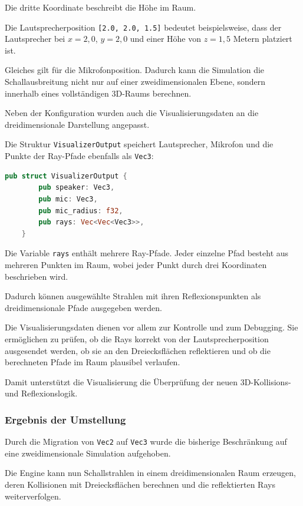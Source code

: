 \documentclass{article}
\begin{document}
    Die dritte Koordinate beschreibt die Höhe im Raum.

    Die Lautsprecherposition \texttt{[2.0, 2.0, 1.5]} bedeutet beispielsweise,
    dass der Lautsprecher bei \(x = 2{,}0\), \(y = 2{,}0\) und einer Höhe von
    \(z = 1{,}5\) Metern platziert ist.

    Gleiches gilt für die Mikrofonposition. Dadurch kann die Simulation die
    Schallausbreitung nicht nur auf einer zweidimensionalen Ebene, sondern
    innerhalb eines vollständigen 3D-Raums berechnen.

    Neben der Konfiguration wurden auch die Visualisierungsdaten an die
    dreidimensionale Darstellung angepasst.

    Die Struktur \texttt{VisualizerOutput} speichert Lautsprecher, Mikrofon und
    die Punkte der Ray-Pfade ebenfalls als \texttt{Vec3}:

    \begin{lstlisting}[language=Rust]
    pub struct VisualizerOutput {
        pub speaker: Vec3,
        pub mic: Vec3,
        pub mic_radius: f32,
        pub rays: Vec<Vec<Vec3>>,
    }
    \end{lstlisting}

    Die Variable \texttt{rays} enthält mehrere Ray-Pfade. Jeder einzelne Pfad
    besteht aus mehreren Punkten im Raum, wobei jeder Punkt durch drei Koordinaten
    beschrieben wird.

    Dadurch können ausgewählte Strahlen mit ihren Reflexionspunkten als
    dreidimensionale Pfade ausgegeben werden.

    Die Visualisierungsdaten dienen vor allem zur Kontrolle und zum Debugging. Sie
    ermöglichen zu prüfen, ob die Rays korrekt von der Lautsprecherposition
    ausgesendet werden, ob sie an den Dreiecksflächen reflektieren und ob die
    berechneten Pfade im Raum plausibel verlaufen.

    Damit unterstützt die Visualisierung die Überprüfung der neuen
    3D-Kollisions- und Reflexionslogik.


    \subsubsection{Ergebnis der Umstellung}
    \label{subsubsec:3d-result}

    Durch die Migration von \texttt{Vec2} auf \texttt{Vec3} wurde die bisherige
    Beschränkung auf eine zweidimensionale Simulation aufgehoben.

    Die Engine kann nun Schallstrahlen in einem dreidimensionalen Raum erzeugen,
    deren Kollisionen mit Dreiecksflächen berechnen und die reflektierten Rays
    weiterverfolgen.
\end{document}
